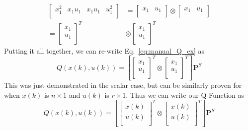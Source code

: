 \begin{equation}
    \begin{split}
        \left[\begin{matrix}x_1^2&x_1u_1&x_1u_1&u_1^2\\\end{matrix}\right]&=\left[\begin{matrix}x_1&u_1\\\end{matrix}\right]\otimes\left[\begin{matrix}x_1&u_1\\\end{matrix}\right] \\
        ={\left[\begin{matrix}x_1\\u_1\\\end{matrix}\right]}^T&\otimes{\left[\begin{matrix}x_1\\u_1\\\end{matrix}\right]}^T
    \end{split}
\end{equation}
Putting it all together, we can re-write Eq.~\ref{eq:manual_Q_ex} as
\begin{equation}
    Q\left(x\left(k\right),u\left(k\right)\right)=\left[{\left[\begin{matrix}x_1\\u_1\\\end{matrix}\right]}^T\otimes{\left[\begin{matrix}x_1\\u_1\\\end{matrix}\right]}^T\right]\textbf{P}^S
\end{equation}
This was just demonstrated in the scalar case, but can be similarly proven for when $x\left(k\right)$ is $n \times1$ and $u\left(k\right)$ is $r \times1$. Thus we can write our Q-Function as
\begin{equation}
    Q\left(x\left(k\right),u\left(k\right)\right)=\left[{\left[\begin{matrix}x\left(k\right)\\u\left(k\right)\\\end{matrix}\right]}^T\otimes{\left[\begin{matrix}x\left(k\right)\\u\left(k\right)\\\end{matrix}\right]}^T\right]\textbf{P}^S
    \label{eq:Q_function_kronP}
\end{equation}
